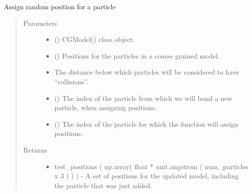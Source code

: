 \documentclass[letterpaper,12pt,english,openany,oneside]{sphinxmanual}
\begin{document}
\begin{fulllineitems}
\label{\detokenize{utilities:utilities.util.assign_position_lattice_style}}
Assign random position for a particle
\begin{quote}\begin{description}
\item[{Parameters}] \leavevmode\begin{itemize}
\item {} 
 () \textendash{} CGModel() class object.

\item {} 
 (\sphinxstyleliteralemphasis{\sphinxupquote{( }}\sphinxstyleliteralemphasis{\sphinxupquote{ ( }}\sphinxstyleliteralemphasis{\sphinxupquote{ ) }}\sphinxstyleliteralemphasis{\sphinxupquote{)}}) \textendash{} Positions for the particles in a coarse grained model.

\item {} 
 \textendash{} The distance below which particles will be considered to have “collisions”.

\item {} 
 () \textendash{} The index of the particle from which we will bond a new particle, when assigning positions.

\item {} 
 () \textendash{} The index of the particle for which the function will assign positions.

\end{itemize}

\item[{Returns}] \leavevmode
\begin{itemize}
\item {} 
test\_positions ( np.array( float * unit.angstrom ( num\_particles x 3 ) ) ) - A set of positions for the updated model, including the particle that was just added.


\end{itemize}
\end{description}
\end{quote}
\end{fulllineitems}
\end{document}
